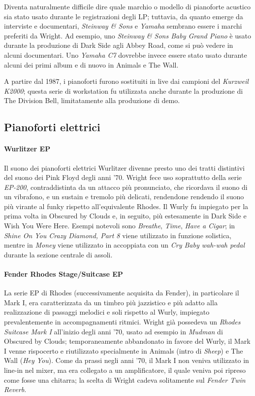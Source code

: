\documentclass[class=book, crop=false, oneside, 12pt]{standalone}
\begin{document}
    Diventa naturalmente difficile dire quale marchio o modello di pianoforte acustico sia stato usato durante le registrazioni degli LP; tuttavia, da quanto emerge da interviste e documentari, \emph{Steinway \& Sons} e \emph{Yamaha} sembrano essere i marchi preferiti da Wright. Ad esempio, uno \emph{Steinway \& Sons Baby Grand Piano} è usato durante la produzione di Dark Side agli Abbey Road, come si può vedere in alcuni documentari. Uno \emph{Yamaha C7} dovrebbe invece essere stato usato durante alcuni dei primi album e di nuovo in Animals e The Wall.

    A partire dal 1987, i pianoforti furono sostituiti in live dai campioni del \emph{Kurzweil K2000}; questa serie di workstation fu utilizzata anche durante la produzione di The Division Bell, limitatamente alla produzione di demo.

    \subsection{Pianoforti elettrici}

    \paragraph{Wurlitzer EP}
    Il suono dei pianoforti elettrici Wurlitzer divenne presto uno dei tratti distintivi del suono dei Pink Floyd degli anni '70. Wright fece uso soprattutto della serie \emph{EP-200}, contraddistinta da un attacco più pronunciato, che ricordava il suono di un vibrafono, e un sustain e tremolo più delicati, rendendone rendendo il suono più virante al funky rispetto all'equivalente Rhodes. Il Wurly fu impiegato per la prima volta in Obscured by Clouds e, in seguito, più estesamente in Dark Side e Wish You Were Here. Esempi notevoli sono \emph{Breathe}, \emph{Time}, \emph{Have a Cigar}; in \emph{Shine On You Crazy Diamond, Part 8} viene utilizzato in funzione solistica, mentre in \emph{Money} viene utilizzato in accoppiata con un \emph{Cry Baby wah-wah pedal} durante la sezione centrale di assoli. 

    \paragraph{Fender Rhodes Stage/Suitcase EP}
    La serie EP di Rhodes (successivamente acquisita da Fender), in particolare il Mark I, era caratterizzata da un timbro più jazzistico e più adatto alla realizzazione di passaggi melodici e soli rispetto al Wurly, impiegato prevalentemente in accompagnamenti ritmici. Wright già possedeva un \emph{Rhodes Suitcase Mark I} all'inizio degli anni '70, usato ad esempio in \emph{Mudman} di Obscured by Clouds; temporaneamente abbandonato in favore del Wurly, il Mark I venne rispocerto e riutilizzato specialmente in Animals (intro di \emph{Sheep}) e The Wall (\emph{Hey You}). Come da prassi negli anni '70, il Mark I non veniva utilizzato in line-in nel mixer, ma era collegato a un amplificatore, il quale veniva poi ripreso come fosse una chitarra; la scelta di Wright cadeva solitamente sul \emph{Fender Twin Reverb}.
\end{document}
